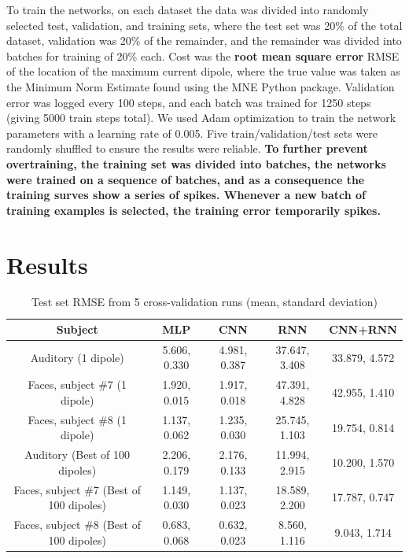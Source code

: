 \documentclass[journal]{IEEEtran}
\begin{document}
To train the networks, on each dataset the data was divided into randomly selected test, validation, and training sets, where the test set was 20\% of the total dataset, validation was 20\% of the remainder, and the remainder was divided into batches for training of 20\% each. Cost was the \textbf{root mean square error} RMSE of the location of the maximum current dipole, where the true value was taken as the Minimum Norm Estimate found using the MNE Python package. Validation error was logged every 100 steps, and each batch was trained for 1250 steps (giving 5000 train steps total). We used Adam optimization to train the network parameters \cite{kingma2014adam} with a learning rate of 0.005. Five train/validation/test sets were randomly shuffled to ensure the results were reliable. \textbf{To further prevent overtraining, the training set was divided into batches, the networks were trained on a sequence of batches, and as a consequence the training surves show a series of spikes. Whenever a new batch of training examples is selected, the training error temporarily spikes.}

\section{Results}

\begin{table}[h!]
  \centering
  \begin{tabular}{c||c|c|c|c}
    \hline
    Subject & MLP & CNN & RNN & CNN+RNN\\
    \hline
    \hline
    Auditory (1 dipole) & 5.606, 0.330 & 4.981, 0.387 & 37.647, 3.408 & 33.879, 4.572 \\
    \hline
    Faces, subject \#7 (1 dipole) &  1.920, 0.015 & 1.917, 0.018 & 47.391, 4.828 & 42.955, 1.410 \\
    \hline
    Faces, subject \#8 (1 dipole) &  1.137, 0.062 & 1.235, 0.030 & 25.745, 1.103 & 19.754, 0.814 \\
    \hline
    Auditory (Best of 100 dipoles) & 2.206, 0.179 & 2.176, 0.133 & 11.994, 2.915 & 10.200, 1.570 \\
    \hline
    Faces, subject \#7 (Best of 100 dipoles) &  1.149, 0.030 & 1.137, 0.023 & 18.589, 2.200 & 17.787, 0.747 \\
    \hline
    Faces, subject \#8 (Best of 100 dipoles) &  0.683, 0.068 & 0.632, 0.023 & 8.560, 1.116 & 9.043, 1.714 \\
    \hline
  \end{tabular}
  \caption{Test set RMSE from 5 cross-validation runs (mean, standard deviation)}
  \label{tab:results}
\end{table}
\end{document}
